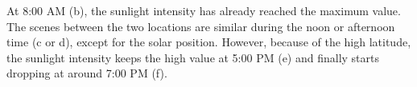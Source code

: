 \documentclass{article}
\begin{document}
\begin{itemize}
At 8:00 AM (b), the sunlight intensity has already reached the maximum value. The scenes between the two locations are 
similar during the noon or afternoon time (c or d), except for the solar position. However, because of the high latitude,
the sunlight intensity keeps the high value at 5:00 PM (e) and finally starts dropping at around 7:00 PM (f).

\begin{figure}[h]
  \centering
  \hfill
  \hfill
  

\end{figure}
\end{itemize}
\end{document}
